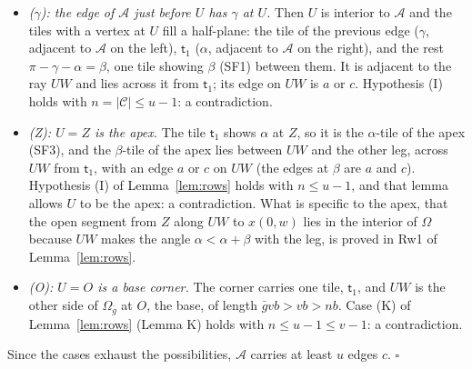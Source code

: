 \documentclass[11pt,reqno]{amsart}
\theoremstyle{plain}
\theoremstyle{definition}
\begin{document}
\begin{itemize}
\item[\textbf{Cs2}] \emph{($\gamma$): the edge of $\mathcal A$ just before $U$ has $\gamma$ at $U$.} Then $U$ is interior to $\mathcal A$ and the tiles with a vertex at $U$ fill a half-plane: the tile of the previous edge ($\gamma$, adjacent to $\mathcal A$ on the left), $\mathsf t_1$ ($\alpha$, adjacent to $\mathcal A$ on the right), and the rest $\pi-\gamma-\alpha=\beta$, one tile showing $\beta$ (SF1) between them. It is adjacent to the ray $UW$ and lies across it from $\mathsf t_1$; its edge on $UW$ is $a$ or $c$. Hypothesis (I) holds with $n=|\mathcal C|\le u-1$: a contradiction.
\item[\textbf{Cs3}] \emph{(Z): $U=Z$ is the apex.} The tile $\mathsf t_1$ shows $\alpha$ at $Z$, so it is the $\alpha$-tile of the apex (SF3), and the $\beta$-tile of the apex lies between $UW$ and the other leg, across $UW$ from $\mathsf t_1$, with an edge $a$ or $c$ on $UW$ (the edges at $\beta$ are $a$ and $c$). Hypothesis (I) of Lemma~\ref{lem:rows} holds with $n\le u-1$, and that lemma allows $U$ to be the apex: a contradiction. What is specific to the apex, that the open segment from $Z$ along $UW$ to $x(0,w)$ lies in the interior of $\Omega$ because $UW$ makes the angle $\alpha<\alpha+\beta$ with the leg, is proved in Rw1 of Lemma~\ref{lem:rows}.
\item[\textbf{Cs4}] \emph{(O): $U=O$ is a base corner.} The corner carries one tile, $\mathsf t_1$, and $UW$ is the other side of $\Omega_{\bar g}$ at $O$, the base, of length $\bar gvb>vb>nb$. Case (K) of Lemma~\ref{lem:rows} (Lemma K) holds with $n\le u-1\le v-1$: a contradiction.
\end{itemize}
Since the cases exhaust the possibilities, $\mathcal A$ carries at least $u$ edges $c$. $\square$
\end{document}
